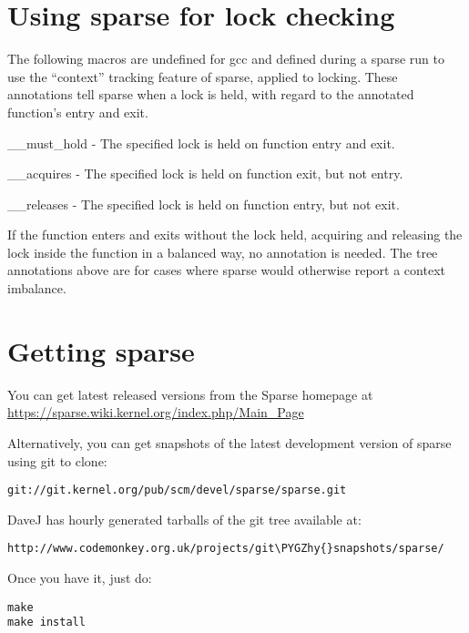 \documentclass[a4paper,8pt,english]{sphinxmanual}
\def\PYGZhy{\char`\-}
\begin{document}
\section{Using sparse for lock checking}
\label{dev-tools/sparse:using-sparse-for-lock-checking}
The following macros are undefined for gcc and defined during a sparse
run to use the ``context'' tracking feature of sparse, applied to
locking.  These annotations tell sparse when a lock is held, with
regard to the annotated function's entry and exit.

\_\_must\_hold - The specified lock is held on function entry and exit.

\_\_acquires - The specified lock is held on function exit, but not entry.

\_\_releases - The specified lock is held on function entry, but not exit.

If the function enters and exits without the lock held, acquiring and
releasing the lock inside the function in a balanced way, no
annotation is needed.  The tree annotations above are for cases where
sparse would otherwise report a context imbalance.


\section{Getting sparse}
\label{dev-tools/sparse:getting-sparse}
You can get latest released versions from the Sparse homepage at
\href{https://sparse.wiki.kernel.org/index.php/Main\_Page}{https://sparse.wiki.kernel.org/index.php/Main\_Page}

Alternatively, you can get snapshots of the latest development version
of sparse using git to clone:

\begin{Verbatim}[commandchars=\\\{\}]
git://git.kernel.org/pub/scm/devel/sparse/sparse.git
\end{Verbatim}

DaveJ has hourly generated tarballs of the git tree available at:

\begin{Verbatim}[commandchars=\\\{\}]
http://www.codemonkey.org.uk/projects/git\PYGZhy{}snapshots/sparse/
\end{Verbatim}

Once you have it, just do:

\begin{Verbatim}[commandchars=\\\{\}]
make
make install
\end{Verbatim}
\end{document}

